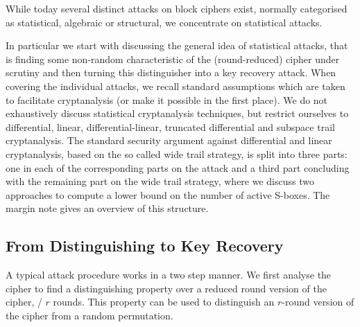 While today several distinct attacks on block ciphers exist, normally categorised as statistical, algebraic or structural, we concentrate on statistical attacks.

In particular we start with discussing the general idea of statistical attacks, that is finding some non-random characteristic of the (round-reduced) cipher under scrutiny and then turning this distinguisher into a key recovery attack.
When covering the individual attacks, we recall standard assumptions which are taken to facilitate cryptanalysis (or make it possible in the first place).
We do not exhaustively discuss statistical cryptanalysis techniques, but restrict ourselves to differential, linear, differential-linear, truncated differential and subspace trail cryptanalysis.
The standard security argument against differential and linear cryptanalysis, based on the so called wide trail strategy, is split into three parts: one in each of the corresponding parts on the attack and a third part concluding with the remaining part on the wide trail strategy, where we discuss two approaches to compute a lower bound on the number of active S-boxes.
The margin note gives an overview of this structure.

\subsection{From Distinguishing to Key Recovery}\label{sec:dist-to-keyrec}
A typical attack procedure works in a two step manner.
We first analyse the cipher to find a distinguishing property over a reduced round version of the cipher, \eg/ $r$ rounds.
This property can be used to distinguish an $r$-round version of the cipher from a random permutation.

